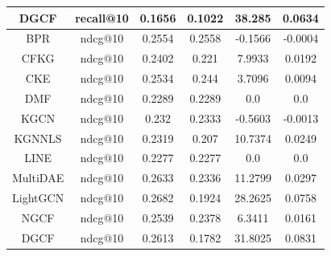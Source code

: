 \begin{table}[H]
{\begin{tabular}{|c|c|c|c|c|c|}
DGCF             & recall@10         & 0.1656                        & 0.1022                           & 38.285                               & 0.0634                                \\ \hline
BPR              & ndcg@10           & 0.2554                        & 0.2558                           & -0.1566                              & -0.0004                               \\ \hline
CFKG             & ndcg@10           & 0.2402                        & 0.221                            & 7.9933                               & 0.0192                                \\ \hline
CKE              & ndcg@10           & 0.2534                        & 0.244                            & 3.7096                               & 0.0094                                \\ \hline
DMF              & ndcg@10           & 0.2289                        & 0.2289                           & 0.0                                  & 0.0                                   \\ \hline
KGCN             & ndcg@10           & 0.232                         & 0.2333                           & -0.5603                              & -0.0013                               \\ \hline
KGNNLS           & ndcg@10           & 0.2319                        & 0.207                            & 10.7374                              & 0.0249                                \\ \hline
LINE             & ndcg@10           & 0.2277                        & 0.2277                           & 0.0                                  & 0.0                                   \\ \hline
MultiDAE         & ndcg@10           & 0.2633                        & 0.2336                           & 11.2799                              & 0.0297                                \\ \hline
LightGCN         & ndcg@10           & 0.2682                        & 0.1924                           & 28.2625                              & 0.0758                                \\ \hline
NGCF             & ndcg@10           & 0.2539                        & 0.2378                           & 6.3411                               & 0.0161                                \\ \hline
DGCF             & ndcg@10           & 0.2613                        & 0.1782                           & 31.8025                              & 0.0831                                \\ \hline

\end{tabular}}
\end{table}
